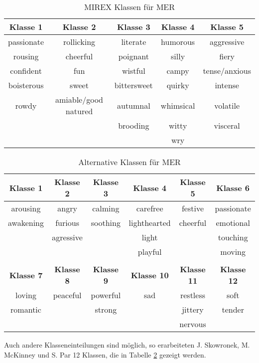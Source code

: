 \documentclass[11pt,a4paper]{article}
\begin{document}
\begin{table}[t]
\begin{tabular}{c c c c c}
\textbf{Klasse 1} & \textbf{Klasse 2} & \textbf{Klasse 3} & \textbf{Klasse 4} & \textbf{Klasse 5} \\
\hline
passionate & rollicking & literate & humorous & aggressive \\
rousing & cheerful & poignant & silly & fiery \\
confident & fun & wistful & campy & tense/anxious \\
boisterous & sweet & bittersweet & quirky & intense \\
rowdy & amiable/good natured & autumnal & whimsical & volatile \\
 & & brooding & witty & visceral \\
  & & & wry &
\end{tabular}
\caption[MIREX Music Emotion Recognition Klassen]{MIREX Klassen für MER}
\label{tab:MIREXclasses}
\end{table}
\begin{table}[!ht]
\begin{tabular}{c c c c c c}
\textbf{Klasse 1} & \textbf{Klasse 2} & \textbf{Klasse 3} & \textbf{Klasse 4} & \textbf{Klasse 5} & \textbf{Klasse 6} \\
\hline
arousing  & angry     & calming  & carefree     & festive  & passionate \\
awakening & furious   & soothing & lighthearted & cheerful & emotional \\
          & agressive &          & light        &          & touching    \\
          &           &          & playful      &          & moving      \\
\vspace{10pt}\\
\textbf{Klasse 7} & \textbf{Klasse 8} & \textbf{Klasse 9} & \textbf{Klasse 10} & \textbf{Klasse 11} & \textbf{Klasse 12}\\
\hline
loving   & peaceful & powerful & sad & restless & soft\\
romantic &          & strong   &     & jittery  & tender\\
         &          &          &     & nervous  & \\
\end{tabular}
\caption[Alternative Music Emotion Recognition Klassen]{Alternative Klassen für MER}
\label{tab:altclasses}
\end{table}
\noindent
Auch andere Klasseneinteilungen sind möglich, so erarbeiteten J. Skowronek, M. McKinney und S. Par  \cite{7cd5f337a4b030e3fafd0b4bc7e0976ff7cc1ec8c28d583c5dab695e0ee78941} 12 Klassen, die in Tabelle \ref{tab:altclasses} gezeigt werden.\\
\end{document}
